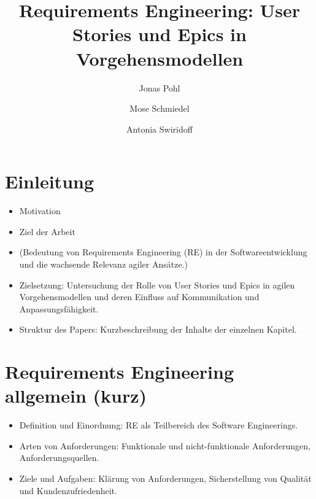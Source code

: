 \documentclass[acmtog]{acmart}
\begin{document}
\title{Requirements Engineering: User Stories und Epics in Vorgehensmodellen}

\author{Jonas Pohl}
\author{Mose Schmiedel}
\authornotemark[1]
\author{Antonia Swiridoff}
\authornotemark[1]

\renewcommand{\shortauthors}{Swiridoff, Pohl und Schmiedel}


\begin{abstract}
\end{abstract}

\maketitle


\section{Einleitung}

\begin{itemize}
\item Motivation
\item Ziel der Arbeit
\item (Bedeutung von Requirements Engineering (RE) in der Softwareentwicklung und die wachsende Relevanz agiler Ansätze.)
\item Zielsetzung: Untersuchung der Rolle von User Stories und Epics in agilen Vorgehensmodellen und deren Einfluss auf Kommunikation und Anpassungsfähigkeit.
\item Struktur des Papers: Kurzbeschreibung der Inhalte der einzelnen Kapitel.
\end{itemize}

\section{Requirements Engineering allgemein (kurz)}
\begin{itemize}
	\item Definition und Einordnung: RE als Teilbereich des Software Engineerings.
	\item Arten von Anforderungen: Funktionale und nicht-funktionale Anforderungen, Anforderungsquellen.
	\item Ziele und Aufgaben: Klärung von Anforderungen, Sicherstellung von Qualität und Kundenzufriedenheit.
\end{itemize}
\end{document}
